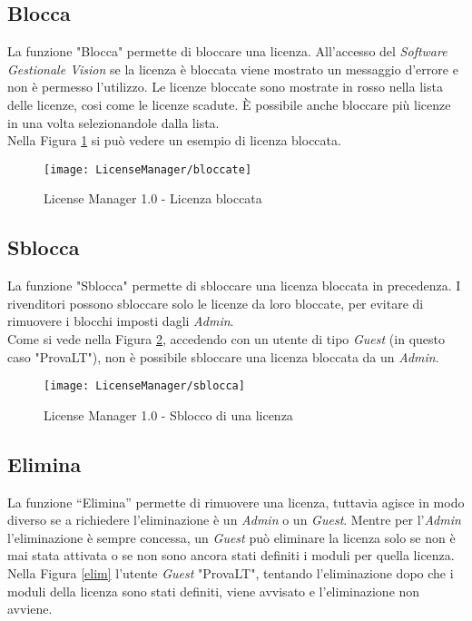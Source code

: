 \subsection{Blocca}

La funzione "Blocca" permette di bloccare una licenza. All’accesso del \textit{Software Gestionale Vision} se la licenza è bloccata viene mostrato un messaggio d’errore e non è permesso l’utilizzo.
Le licenze bloccate sono mostrate in rosso nella lista delle licenze, cosi come le licenze scadute.
È possibile anche bloccare più licenze in una volta selezionandole dalla lista.
\\
Nella Figura \ref{block} si può vedere un esempio di licenza bloccata.
\begin{figure}[!h] 
    \centering 
    \texttt{[image: LicenseManager/bloccate]} 
    \caption{License Manager 1.0 - Licenza bloccata}
\label{block}
\end{figure}

\subsection{Sblocca}
La funzione "Sblocca" permette di sbloccare una licenza bloccata in precedenza.
I rivenditori possono sbloccare solo le licenze da loro bloccate, per evitare di rimuovere i blocchi imposti dagli \textit{Admin}.\\
Come si vede nella Figura \ref{sblocca}, accedendo con un utente di tipo \textit{Guest} (in questo caso "ProvaLT"), non è possibile sbloccare una licenza bloccata da un \textit{Admin}.

\begin{figure}[!h] 
    \centering 
    \texttt{[image: LicenseManager/sblocca]} 
    \caption{License Manager 1.0 - Sblocco di una licenza}
\label{sblocca}
\end{figure}

\subsection{Elimina}
La funzione “Elimina” permette di rimuovere una licenza, tuttavia agisce in modo diverso se a richiedere l'eliminazione è un \textit{Admin} o un \textit{Guest}. Mentre per l’\textit{Admin} l’eliminazione è sempre concessa, un \textit{Guest} può eliminare la licenza solo se non è mai stata attivata o se non sono ancora stati definiti i moduli per quella licenza.\\
Nella Figura \ref{elim} l’utente \textit{Guest} "ProvaLT", tentando l’eliminazione dopo che i moduli della licenza sono stati definiti, viene avvisato e l’eliminazione non avviene.

